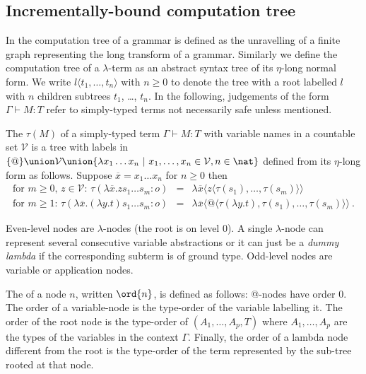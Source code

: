 \subsection*{Incrementally-bound computation tree}
 In \cite{OngLics2006} the computation tree of a grammar is
defined as the unravelling of a finite graph representing the long
transform of a grammar. Similarly we define the computation tree of
a $\lambda$-term as an abstract syntax tree of its $\eta$-long
normal form.  We write $l\langle t_1, \ldots, t_n \rangle$ with $n
\geq 0$ to denote the tree with a root labelled $l$ with $n$
children subtrees $t_1$, \ldots, $t_n$. In the following, judgements
of the form $\Gamma \vdash M:T$ refer to simply-typed terms not
necessarily safe unless  mentioned.

\begin{definition}\rm
\label{dfn:comptree}
  The  $\tau(M)$ of a simply-typed term
  $\Gamma \vdash M:T$ with variable names in a countable set
  $\mathcal{V}$ is a tree with labels in $ \{ @ \} \union \mathcal{V}
  \union \{ \lambda x_1 \ldots x_n \ | \ x_1 ,\ldots, x_n \in
  \mathcal{V}, n\in\nat \}$ defined from its $\eta$-long form as follows. Suppose $\overline{x} = x_1 \ldots x_n$ for $n\geq 0$ then
\begin{eqnarray*}
  \mbox{for $m\geq 0$, $z \in \mathcal{V}$: } \tau(\lambda \overline{x} . z s_1 \ldots s_m : o) &=& \lambda \overline{x} \langle z \langle\tau(s_1),\ldots,\tau(s_m)\rangle\rangle \\
  \mbox{for $m \geq 1$: } \tau(\lambda \overline{x} . (\lambda y.t) s_1 \ldots s_m :o) &=& \lambda \overline{x} \langle @ \langle \tau(\lambda y.t),\tau(s_1),\ldots,\tau(s_m) \rangle \rangle \ .
\end{eqnarray*}
\end{definition}

Even-level nodes are $\lambda$-nodes (the root is on level 0). A
single $\lambda$-node can represent several consecutive variable
abstractions or it can just be a \emph{dummy lambda} if the
corresponding subterm is of ground type.  Odd-level nodes are
variable or application nodes.

The  of a node $n$, written $\ord{n}$, is defined as
follows: @-nodes have order $0$. The order of a variable-node is the
type-order of the variable labelling it. The order of the root node
is the type-order of $(A_1,\ldots,A_p, T)$ where $A_1,\ldots, A_p$
are the types of the variables in the context $\Gamma$. Finally, the
order of a lambda node different from the root is the type-order of
the term represented by the sub-tree rooted at that node.

